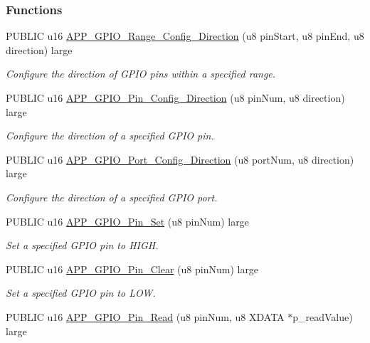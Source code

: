 \subsubsection*{Functions}
\begin{DoxyCompactItemize}
\item 
P\+U\+B\+L\+IC u16 \hyperlink{group___g_p_i_o_gae8f7f8102a23b119e9a503f9b728ae5b}{A\+P\+P\+\_\+\+G\+P\+I\+O\+\_\+\+Range\+\_\+\+Config\+\_\+\+Direction} (u8 pin\+Start, u8 pin\+End, u8 direction) large
\begin{DoxyCompactList}\small\item\em Configure the direction of G\+P\+IO pins within a specified range. \end{DoxyCompactList}\item 
P\+U\+B\+L\+IC u16 \hyperlink{group___g_p_i_o_gae1b49c05a6789910873067695e193149}{A\+P\+P\+\_\+\+G\+P\+I\+O\+\_\+\+Pin\+\_\+\+Config\+\_\+\+Direction} (u8 pin\+Num, u8 direction) large
\begin{DoxyCompactList}\small\item\em Configure the direction of a specified G\+P\+IO pin. \end{DoxyCompactList}\item 
P\+U\+B\+L\+IC u16 \hyperlink{group___g_p_i_o_ga6d916949d52ef84903312ef818fa234a}{A\+P\+P\+\_\+\+G\+P\+I\+O\+\_\+\+Port\+\_\+\+Config\+\_\+\+Direction} (u8 port\+Num, u8 direction) large
\begin{DoxyCompactList}\small\item\em Configure the direction of a specified G\+P\+IO port. \end{DoxyCompactList}\item 
P\+U\+B\+L\+IC u16 \hyperlink{group___g_p_i_o_ga41e0fc2d8af1c81c46e3840028a14a1e}{A\+P\+P\+\_\+\+G\+P\+I\+O\+\_\+\+Pin\+\_\+\+Set} (u8 pin\+Num) large
\begin{DoxyCompactList}\small\item\em Set a specified G\+P\+IO pin to H\+I\+GH. \end{DoxyCompactList}\item 
P\+U\+B\+L\+IC u16 \hyperlink{group___g_p_i_o_ga0e27a69df0f8dfd4c37cefd4804b9ace}{A\+P\+P\+\_\+\+G\+P\+I\+O\+\_\+\+Pin\+\_\+\+Clear} (u8 pin\+Num) large
\begin{DoxyCompactList}\small\item\em Set a specified G\+P\+IO pin to L\+OW. \end{DoxyCompactList}\item 
P\+U\+B\+L\+IC u16 \hyperlink{group___g_p_i_o_ga75214ef2ec9de27e74ea028a41a9881f}{A\+P\+P\+\_\+\+G\+P\+I\+O\+\_\+\+Pin\+\_\+\+Read} (u8 pin\+Num, u8 X\+D\+A\+TA $\ast$p\+\_\+read\+Value) large

\end{DoxyCompactItemize}
